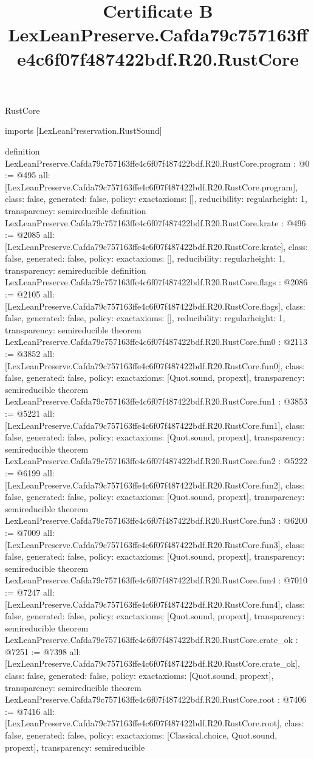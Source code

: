 \begin{lexlean}{RustCore}
\title{Certificate B LexLeanPreserve.Cafda79c757163ffe4c6f07f487422bdf.R20.RustCore}
\begin{coremodule}
imports [LexLeanPreservation.RustSound]

definition LexLeanPreserve.Cafda79c757163ffe4c6f07f487422bdf.R20.RustCore.program : @0 := @495 {
  all: [LexLeanPreserve.Cafda79c757163ffe4c6f07f487422bdf.R20.RustCore.program],
  class: false,
  generated: false,
  policy: exact{axioms: []},
  reducibility: regular{height: 1},
  transparency: semireducible
}
definition LexLeanPreserve.Cafda79c757163ffe4c6f07f487422bdf.R20.RustCore.krate : @496 := @2085 {
  all: [LexLeanPreserve.Cafda79c757163ffe4c6f07f487422bdf.R20.RustCore.krate],
  class: false,
  generated: false,
  policy: exact{axioms: []},
  reducibility: regular{height: 1},
  transparency: semireducible
}
definition LexLeanPreserve.Cafda79c757163ffe4c6f07f487422bdf.R20.RustCore.flags : @2086 := @2105 {
  all: [LexLeanPreserve.Cafda79c757163ffe4c6f07f487422bdf.R20.RustCore.flags],
  class: false,
  generated: false,
  policy: exact{axioms: []},
  reducibility: regular{height: 1},
  transparency: semireducible
}
theorem LexLeanPreserve.Cafda79c757163ffe4c6f07f487422bdf.R20.RustCore.fun0 : @2113 := @3852 {
  all: [LexLeanPreserve.Cafda79c757163ffe4c6f07f487422bdf.R20.RustCore.fun0],
  class: false,
  generated: false,
  policy: exact{axioms: [Quot.sound, propext]},
  transparency: semireducible
}
theorem LexLeanPreserve.Cafda79c757163ffe4c6f07f487422bdf.R20.RustCore.fun1 : @3853 := @5221 {
  all: [LexLeanPreserve.Cafda79c757163ffe4c6f07f487422bdf.R20.RustCore.fun1],
  class: false,
  generated: false,
  policy: exact{axioms: [Quot.sound, propext]},
  transparency: semireducible
}
theorem LexLeanPreserve.Cafda79c757163ffe4c6f07f487422bdf.R20.RustCore.fun2 : @5222 := @6199 {
  all: [LexLeanPreserve.Cafda79c757163ffe4c6f07f487422bdf.R20.RustCore.fun2],
  class: false,
  generated: false,
  policy: exact{axioms: [Quot.sound, propext]},
  transparency: semireducible
}
theorem LexLeanPreserve.Cafda79c757163ffe4c6f07f487422bdf.R20.RustCore.fun3 : @6200 := @7009 {
  all: [LexLeanPreserve.Cafda79c757163ffe4c6f07f487422bdf.R20.RustCore.fun3],
  class: false,
  generated: false,
  policy: exact{axioms: [Quot.sound, propext]},
  transparency: semireducible
}
theorem LexLeanPreserve.Cafda79c757163ffe4c6f07f487422bdf.R20.RustCore.fun4 : @7010 := @7247 {
  all: [LexLeanPreserve.Cafda79c757163ffe4c6f07f487422bdf.R20.RustCore.fun4],
  class: false,
  generated: false,
  policy: exact{axioms: [Quot.sound, propext]},
  transparency: semireducible
}
theorem LexLeanPreserve.Cafda79c757163ffe4c6f07f487422bdf.R20.RustCore.crate_ok : @7251 := @7398 {
  all: [LexLeanPreserve.Cafda79c757163ffe4c6f07f487422bdf.R20.RustCore.crate_ok],
  class: false,
  generated: false,
  policy: exact{axioms: [Quot.sound, propext]},
  transparency: semireducible
}
theorem LexLeanPreserve.Cafda79c757163ffe4c6f07f487422bdf.R20.RustCore.root : @7406 := @7416 {
  all: [LexLeanPreserve.Cafda79c757163ffe4c6f07f487422bdf.R20.RustCore.root],
  class: false,
  generated: false,
  policy: exact{axioms: [Classical.choice, Quot.sound, propext]},
  transparency: semireducible
}


\end{coremodule}
\end{lexlean}
